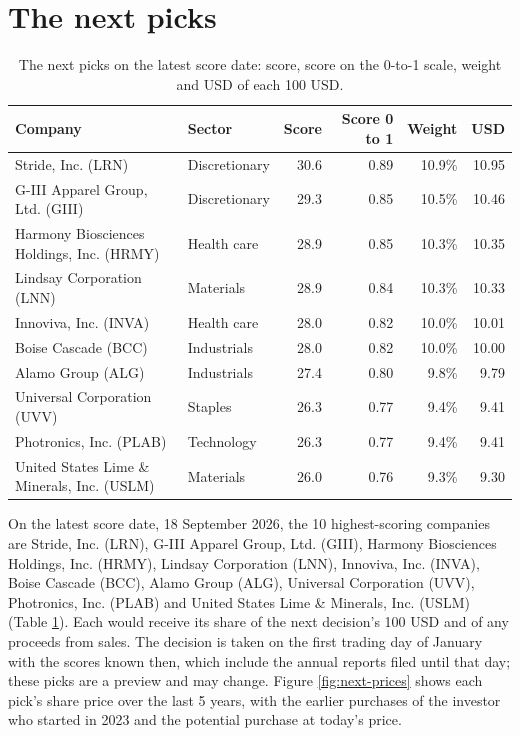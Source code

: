 \documentclass[11pt,a4paper]{article}
\begin{document}
\section{The next picks}
\begin{table}[H]
\centering
\small
\caption{The next picks on the latest score date: score, score on the 0-to-1 scale, weight and USD of each 100 USD.}\label{tab:next}
\begin{tabular}{l l r r r r}
\hline
Company & Sector & Score & Score 0 to 1 & Weight & USD \\
\hline
Stride, Inc. (LRN) & Discretionary & 30.6 & 0.89 & 10.9\% & 10.95 \\
G-III Apparel Group, Ltd. (GIII) & Discretionary & 29.3 & 0.85 & 10.5\% & 10.46 \\
Harmony Biosciences Holdings, Inc. (HRMY) & Health care & 28.9 & 0.85 & 10.3\% & 10.35 \\
Lindsay Corporation (LNN) & Materials & 28.9 & 0.84 & 10.3\% & 10.33 \\
Innoviva, Inc. (INVA) & Health care & 28.0 & 0.82 & 10.0\% & 10.01 \\
Boise Cascade (BCC) & Industrials & 28.0 & 0.82 & 10.0\% & 10.00 \\
Alamo Group (ALG) & Industrials & 27.4 & 0.80 & 9.8\% & 9.79 \\
Universal Corporation (UVV) & Staples & 26.3 & 0.77 & 9.4\% & 9.41 \\
Photronics, Inc. (PLAB) & Technology & 26.3 & 0.77 & 9.4\% & 9.41 \\
United States Lime \& Minerals, Inc. (USLM) & Materials & 26.0 & 0.76 & 9.3\% & 9.30 \\
\hline
\end{tabular}
\end{table}
On the latest score date, 18 September 2026, the 10 highest-scoring companies are Stride, Inc. (LRN), G-III Apparel Group, Ltd. (GIII), Harmony Biosciences Holdings, Inc. (HRMY), Lindsay Corporation (LNN), Innoviva, Inc. (INVA), Boise Cascade (BCC), Alamo Group (ALG), Universal Corporation (UVV), Photronics, Inc. (PLAB) and United States Lime \& Minerals, Inc. (USLM) (Table \ref{tab:next}). Each would receive its share of the next decision's 100 USD and of any proceeds from sales. The decision is taken on the first trading day of January with the scores known then, which include the annual reports filed until that day; these picks are a preview and may change. Figure \ref{fig:next-prices} shows each pick's share price over the last 5 years, with the earlier purchases of the investor who started in 2023 and the potential purchase at today's price.
\end{document}
